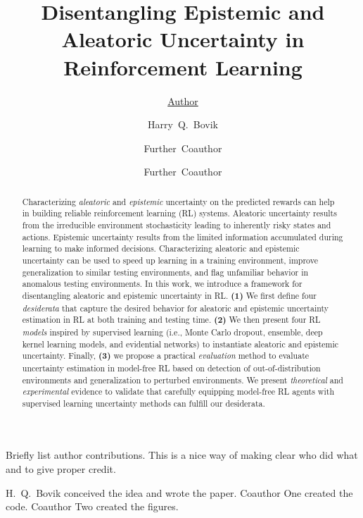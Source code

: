 \documentclass{uai2022} %
\title{Disentangling Epistemic and Aleatoric Uncertainty in Reinforcement Learning}
\author[1]{\href{mailto:<jj@example.edu>?Subject=Your UAI 2022 paper}{Author}{}}
\author[2]{Harry~Q.~Bovik}
\author[2]{Further~Coauthor}
\author[1]{Further~Coauthor}
\affil[1]{%
    Computer Science Dept.\\
    Cranberry University\\
    Pittsburgh, Pennsylvania, USA
}
\affil[2]{%
    Second Affiliation\\
    Address\\
    …
}
\begin{document}
\maketitle

\begin{abstract}

    Characterizing \emph{aleatoric} and \emph{epistemic} uncertainty on the predicted rewards can help in building reliable reinforcement learning (RL) systems. Aleatoric uncertainty results from the irreducible environment stochasticity leading to inherently risky states and actions. Epistemic uncertainty results from the limited information accumulated during learning to make informed decisions. Characterizing aleatoric and epistemic uncertainty can be used to speed up learning in a training environment, improve generalization to similar testing environments, and flag unfamiliar behavior in anomalous testing environments. In this work, we introduce a framework for disentangling aleatoric and epistemic uncertainty in RL. \textbf{(1)} We first define four \emph{desiderata} that capture the desired behavior for aleatoric and epistemic uncertainty estimation in RL at both training and testing time. \textbf{(2)} We then present four RL \emph{models} inspired by supervised learning (i.e., Monte Carlo dropout, ensemble, deep kernel learning models, and evidential networks) to instantiate aleatoric and epistemic uncertainty. Finally, \textbf{(3)} we propose a practical \emph{evaluation} method to evaluate uncertainty estimation in model-free RL based on detection of out-of-distribution environments and generalization to perturbed environments. We present \emph{theoretical} and \emph{experimental} evidence to validate that carefully equipping model-free RL agents with supervised learning uncertainty methods can fulfill our desiderata.
    
\end{abstract}







%


\begin{contributions} %
    Briefly list author contributions.
    This is a nice way of making clear who did what and to give proper credit.

    H.~Q.~Bovik conceived the idea and wrote the paper.
    Coauthor One created the code.
    Coauthor Two created the figures.
\end{contributions}
\end{document}
